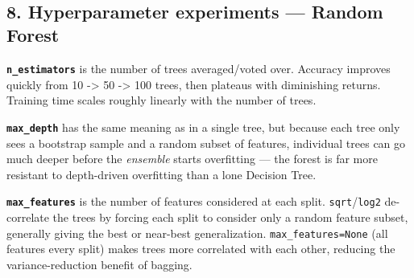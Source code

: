 \documentclass[11pt]{article}
\begin{document}
    \begin{center}
    \end{center}
    { \hspace*{\fill} \\}
    
    \subsection{8. Hyperparameter experiments --- Random
Forest}\label{hyperparameter-experiments-random-forest}

\textbf{\texttt{n\_estimators}} is the number of trees averaged/voted
over. Accuracy improves quickly from 10 -\textgreater{} 50
-\textgreater{} 100 trees, then plateaus with diminishing returns.
Training time scales roughly linearly with the number of trees.

\textbf{\texttt{max\_depth}} has the same meaning as in a single tree,
but because each tree only sees a bootstrap sample and a random subset
of features, individual trees can go much deeper before the
\emph{ensemble} starts overfitting --- the forest is far more resistant
to depth-driven overfitting than a lone Decision Tree.

\textbf{\texttt{max\_features}} is the number of features considered at
each split. \texttt{sqrt}/\texttt{log2} de-correlate the trees by
forcing each split to consider only a random feature subset, generally
giving the best or near-best generalization. \texttt{max\_features=None}
(all features every split) makes trees more correlated with each other,
reducing the variance-reduction benefit of bagging.
\end{document}
